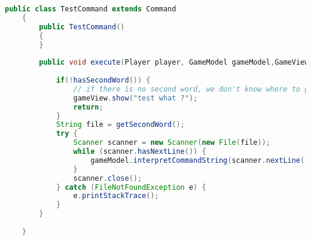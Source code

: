 \documentclass[a4paper , 10pt]{article}
\begin{document}
\begin{lstlisting}[language=Java, caption={Testcommand}]
    public class TestCommand extends Command
    {
        public TestCommand()
        {
        }
    
        public void execute(Player player, GameModel gameModel,GameView gameView){
    
            if(!hasSecondWord()) {
                // if there is no second word, we don't know where to go...
                gameView.show("test what ?");
                return;
            }
            String file = getSecondWord();
            try {
                Scanner scanner = new Scanner(new File(file));
                while (scanner.hasNextLine()) {
                    gameModel.interpretCommandString(scanner.nextLine());
                }
                scanner.close();
            } catch (FileNotFoundException e) {
                e.printStackTrace();
            }
        }
        
    }
    
\end{lstlisting}
\end{document}
